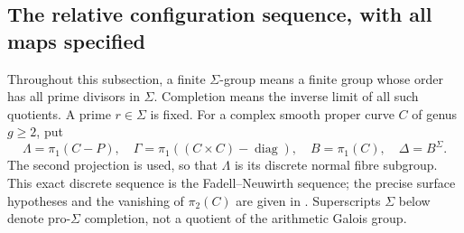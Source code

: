 \subsection{The relative configuration sequence, with all maps specified}

Throughout this subsection, a finite $\Sigma$-group means a finite group
whose order has all prime divisors in $\Sigma$. Completion means the
inverse limit of all such quotients. A prime $r\in\Sigma$ is fixed.
For a complex smooth proper curve $C$ of genus $g\geq2$, put
\[
 \Lambda=\pi_1(C-P),\quad \Gamma=\pi_1((C\times C)-\operatorname{diag}),
 \quad B=\pi_1(C),\quad \Delta=B^{\Sigma}.
\]
The second projection is used, so that $\Lambda$ is its discrete normal
fibre subgroup. This exact discrete sequence is the
Fadell--Neuwirth sequence; the precise surface hypotheses and the
vanishing of $\pi_2(C)$ are given in
\citet[Section 2.1]{Bellingeri2004}. Superscripts $\Sigma$ below denote
pro-$\Sigma$ completion, not a quotient of the arithmetic Galois group.

